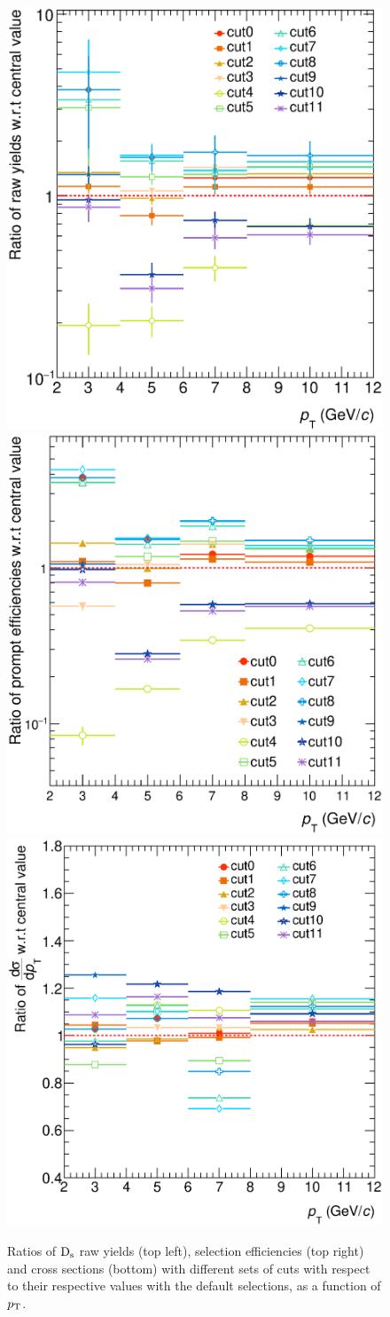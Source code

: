  
\begin{figure}[!h]
\begin{center}
 \includegraphics[width=.49\textwidth]{FigCap4/cutVariationPlot_pass4_rawY.eps}
 \includegraphics[width=.49\textwidth]{FigCap4/efficiencies_cuts0to12.eps}
 \includegraphics[width=.49\textwidth]{FigCap4/cutVariationPlot_pass4.eps}
\caption{Ratios of ${\rm D_s}$ raw yields (top left), selection efficiencies (top right) and cross sections (bottom) with different sets of cuts with respect to their respective values with the default selections, as a function of $p_{\rm T}$.}             
\label{fig:cutVar}
\end{center}
\end{figure} 
